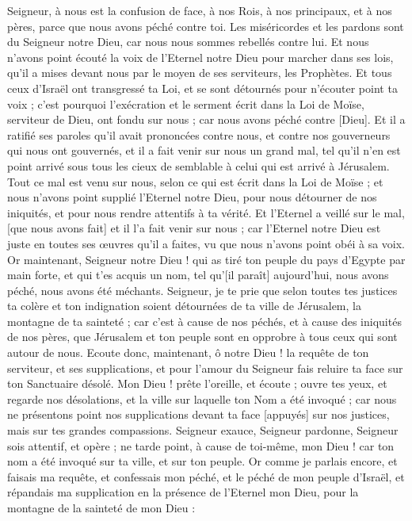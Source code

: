 \begin{multicols}{2}
Seigneur, à nous est la confusion de face, à nos Rois, à nos principaux, et à nos pères, parce que nous avons péché contre toi.
Les miséricordes et les pardons sont du Seigneur notre Dieu, car nous nous sommes rebellés contre lui.
Et nous n'avons point écouté la voix de l'Eternel notre Dieu pour marcher dans ses lois, qu'il a mises devant nous par le moyen de ses serviteurs, les Prophètes.
Et tous ceux d'Israël ont transgressé ta Loi, et se sont détournés pour n'écouter point ta voix ; c'est pourquoi l'exécration et le serment écrit dans la Loi de Moïse, serviteur de Dieu, ont fondu sur nous ; car nous avons péché contre [Dieu].
Et il a ratifié ses paroles qu'il avait prononcées contre nous, et contre nos gouverneurs qui nous ont gouvernés, et il a fait venir sur nous un grand mal, tel qu'il n'en est point arrivé sous tous les cieux de semblable à celui qui est arrivé à Jérusalem.
Tout ce mal est venu sur nous, selon ce qui est écrit dans la Loi de Moïse ; et nous n'avons point supplié l'Eternel notre Dieu, pour nous détourner de nos iniquités, et pour nous rendre attentifs à ta vérité.
Et l'Eternel a veillé sur le mal, [que nous avons fait] et il l'a fait venir sur nous ; car l'Eternel notre Dieu est juste en toutes ses œuvres qu'il a faites, vu que nous n'avons point obéi à sa voix.
Or maintenant, Seigneur notre Dieu ! qui as tiré ton peuple du pays d'Egypte par main forte, et qui t'es acquis un nom, tel qu'[il paraît] aujourd'hui, nous avons péché, nous avons été méchants.
Seigneur, je te prie que selon toutes tes justices ta colère et ton indignation soient détournées de ta ville de Jérusalem, la montagne de ta sainteté ; car c'est à cause de nos péchés, et à cause des iniquités de nos pères, que Jérusalem et ton peuple sont en opprobre à tous ceux qui sont autour de nous.
Ecoute donc, maintenant, ô notre Dieu ! la requête de ton serviteur, et ses supplications, et pour l'amour du Seigneur fais reluire ta face sur ton Sanctuaire désolé.
Mon Dieu ! prête l'oreille, et écoute ; ouvre tes yeux, et regarde nos désolations, et la ville sur laquelle ton Nom a été invoqué ; car nous ne présentons point nos supplications devant ta face [appuyés] sur nos justices, mais sur tes grandes compassions.
Seigneur exauce, Seigneur pardonne, Seigneur sois attentif, et opère ; ne tarde point, à cause de toi-même, mon Dieu ! car ton nom a été invoqué sur ta ville, et sur ton peuple.
Or comme je parlais encore, et faisais ma requête, et confessais mon péché, et le péché de mon peuple d'Israël, et répandais ma supplication en la présence de l'Eternel mon Dieu, pour la montagne de la sainteté de mon Dieu :

\end{multicols}

